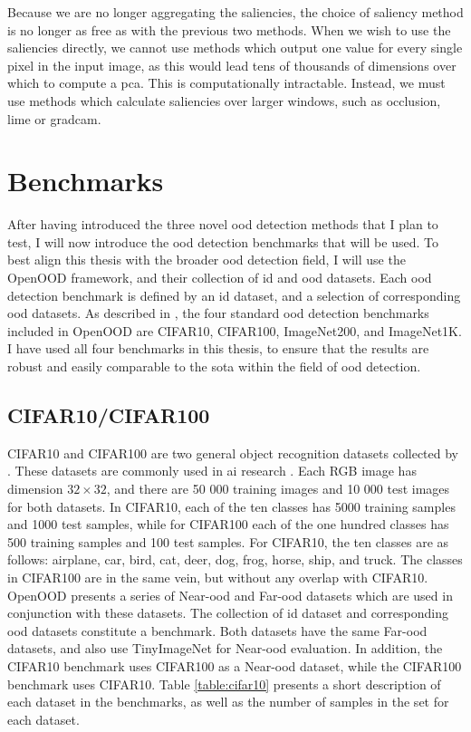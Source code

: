 \documentclass[UKenglish]{uiomasterthesis} %
\theoremstyle{definition}
\begin{document}
Because we are no longer aggregating the saliencies, the choice of saliency method is no longer as free as with the previous two methods. When we wish to use the saliencies directly, we cannot use methods which output one value for every single pixel in the input image, as this would lead tens of thousands of dimensions over which to compute a \acf{pca}. This is computationally intractable. Instead, we must use methods which calculate saliencies over larger windows, such as occlusion, \ac{lime} or \ac{gradcam}.


\section{Benchmarks} \label{section:benchmarks}

After having introduced the three novel \ac{ood} detection methods that I plan to test, I will now introduce the \ac{ood} detection benchmarks that will be used. To best align this thesis with the broader \ac{ood} detection field, I will use the OpenOOD framework, and their collection of \ac{id} and \ac{ood} datasets. Each \ac{ood} detection benchmark is defined by an \ac{id} dataset, and a selection of corresponding \ac{ood} datasets. As described in \cite{openood15}, the four standard \ac{ood} detection benchmarks included in OpenOOD are CIFAR10, CIFAR100, ImageNet200, and ImageNet1K. I have used all four benchmarks in this thesis, to ensure that the results are robust and easily comparable to the \ac{sota} within the field of \ac{ood} detection.

\subsection{CIFAR10/CIFAR100}

CIFAR10 and CIFAR100 are two general object recognition datasets collected by \cite{cifar}. These datasets are commonly used in \ac{ai} research \cite{pouyanfar2018survey}. Each RGB image has dimension $32 \times 32$, and there are 50 000 training images and 10 000 test images for both datasets. In CIFAR10, each of the ten classes has 5000 training samples and 1000 test samples, while for CIFAR100 each of the one hundred classes has 500 training samples and 100 test samples. For CIFAR10, the ten classes are as follows: airplane, car, bird, cat, deer, dog, frog, horse, ship, and truck. The classes in CIFAR100 are in the same vein, but without any overlap with CIFAR10. OpenOOD presents a series of Near-\ac{ood} and Far-\ac{ood} datasets which are used in conjunction with these datasets. The collection of \ac{id} dataset and corresponding \ac{ood} datasets constitute a benchmark. Both datasets have the same Far-\ac{ood} datasets, and also use TinyImageNet for Near-\ac{ood} evaluation. In addition, the CIFAR10 benchmark uses CIFAR100 as a Near-\ac{ood} dataset, while the CIFAR100 benchmark uses CIFAR10. Table \ref{table:cifar10} presents a short description of each dataset in the benchmarks, as well as the number of samples in the set for each dataset.
\end{document}

